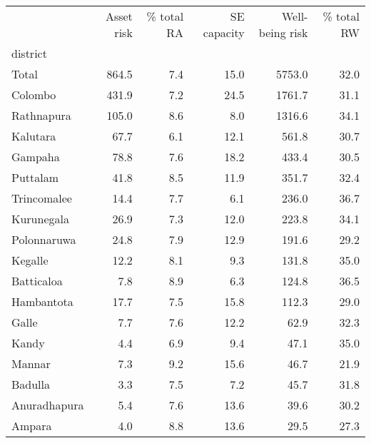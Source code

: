 \begin{tabular}{lrrrrr}
\toprule
{} &  Asset risk &  \% total RA &  SE capacity &  Well-being risk &  \% total RW \\
district     &             &             &              &                  &             \\
\midrule
Total        &       864.5 &         7.4 &         15.0 &           5753.0 &        32.0 \\
Colombo      &       431.9 &         7.2 &         24.5 &           1761.7 &        31.1 \\
Rathnapura   &       105.0 &         8.6 &          8.0 &           1316.6 &        34.1 \\
Kalutara     &        67.7 &         6.1 &         12.1 &            561.8 &        30.7 \\
Gampaha      &        78.8 &         7.6 &         18.2 &            433.4 &        30.5 \\
Puttalam     &        41.8 &         8.5 &         11.9 &            351.7 &        32.4 \\
Trincomalee  &        14.4 &         7.7 &          6.1 &            236.0 &        36.7 \\
Kurunegala   &        26.9 &         7.3 &         12.0 &            223.8 &        34.1 \\
Polonnaruwa  &        24.8 &         7.9 &         12.9 &            191.6 &        29.2 \\
Kegalle      &        12.2 &         8.1 &          9.3 &            131.8 &        35.0 \\
Batticaloa   &         7.8 &         8.9 &          6.3 &            124.8 &        36.5 \\
Hambantota   &        17.7 &         7.5 &         15.8 &            112.3 &        29.0 \\
Galle        &         7.7 &         7.6 &         12.2 &             62.9 &        32.3 \\
Kandy        &         4.4 &         6.9 &          9.4 &             47.1 &        35.0 \\
Mannar       &         7.3 &         9.2 &         15.6 &             46.7 &        21.9 \\
Badulla      &         3.3 &         7.5 &          7.2 &             45.7 &        31.8 \\
Anuradhapura &         5.4 &         7.6 &         13.6 &             39.6 &        30.2 \\
Ampara       &         4.0 &         8.8 &         13.6 &             29.5 &        27.3 \\

\end{tabular}
